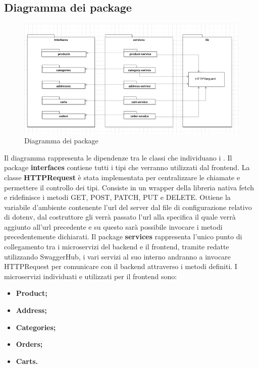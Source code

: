 \subsection{Diagramma dei package}
\begin{figure}[H]
	\centering
	\includegraphics[scale=0.5]{Immagini/Frontend/DiagrammadeiPackage.png}
	\caption{Diagramma dei package}
	\label{fig:fe-packages}
\end{figure}
Il diagramma rappresenta le dipendenze tra le classi che individuano i .
Il package \textbf{interfaces} contiene tutti i tipi che verranno utilizzati dal frontend.
La classe \textbf{HTTPRequest} è stata implementata per centralizzare le chiamate  e permettere il controllo dei tipi. Consiste in un wrapper della libreria nativa fetch e ridefinisce i metodi GET, POST, PATCH, PUT e DELETE. Ottiene la variabile d'ambiente contenente l'url del server dal file di configurazione relativo di dotenv, dal costruttore gli verrà passato l'url alla specifica  il quale verrà aggiunto all'url precedente e su questo sarà possibile invocare i metodi precedentemente dichiarati.
Il package \textbf{services} rappresenta l'unico punto di collegamento tra i microservizi del backend e il frontend, tramite  redatte utilizzando SwaggerHub, i vari servizi al suo interno andranno a invocare HTTPRequest per comunicare con il backend attraverso i metodi definiti.
I microservizi individuati e utilizzati per il frontend sono:
\begin{itemize}
	\item \textbf{Product;}
	\item \textbf{Address;}
	\item \textbf{Categories;}
	\item \textbf{Orders;}
	\item \textbf{Carts.}
\end{itemize}
